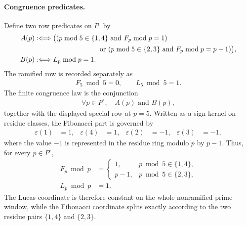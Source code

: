 \paragraph{Congruence predicates.}
Define two row predicates on $P^{\circ}$ by
$$
\begin{aligned}
A(p) &:\Longleftrightarrow \bigl((p\bmod 5\in\{1,4\}\text{ and }F_p\bmod p=1)\\
&\hspace{3.2cm}\text{ or }(p\bmod 5\in\{2,3\}\text{ and }F_p\bmod p=p-1)\bigr),\\
B(p) &:\Longleftrightarrow L_p\bmod p=1.
\end{aligned}
$$
The ramified row is recorded separately as
$$
\begin{aligned}
F_5\bmod 5=0,\qquad L_5\bmod 5=1.
\end{aligned}
$$
The finite congruence law is the conjunction
$$
\begin{aligned}
\forall p\in P^{\circ},\quad A(p)\text{ and }B(p),
\end{aligned}
$$
together with the displayed special row at $p=5$. Written as a sign kernel on residue classes, the Fibonacci part is governed by
$$
\begin{aligned}
\varepsilon(1)&=1, & \varepsilon(4)&=1, & \varepsilon(2)&=-1, & \varepsilon(3)&=-1,
\end{aligned}
$$
where the value $-1$ is represented in the residue ring modulo $p$ by $p-1$. Thus, for every $p\in P^{\circ}$,
$$
\begin{aligned}
F_p\bmod p &=
\begin{cases}
1, & p\bmod 5\in\{1,4\},\\
p-1, & p\bmod 5\in\{2,3\},
\end{cases}\\
L_p\bmod p &=1.
\end{aligned}
$$
The Lucas coordinate is therefore constant on the whole nonramified prime window, while the Fibonacci coordinate splits exactly according to the two residue pairs $\{1,4\}$ and $\{2,3\}$.

